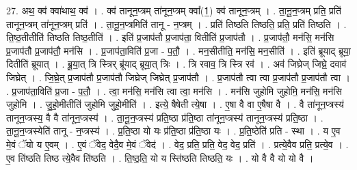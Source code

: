 \documentclass[17pt]{extarticle}
\begin{document}
27. अथ॒ क्व॑ क्वा॑थाथ॒ क्व॑ । . क्व॑ तानून॒प्त्रम् ता॑नून॒प्त्रम् क्वा᳚(1॒) क्व॑ तानून॒प्त्रम् । . ता॒नू॒न॒प्त्रम् प्रति॒ प्रति॑ तानून॒प्त्रम् ता॑नून॒प्त्रम् प्रति॑ । . ता॒नू॒न॒प्त्रमिति॑ तानू - न॒प्त्रम् । . प्रति॑ तिष्ठति तिष्ठति॒ प्रति॒ प्रति॑ तिष्ठति । . ति॒ष्ठ॒तीतीति॑ तिष्ठति तिष्ठ॒तीति॑ । . इति॑ प्र॒जाप॑तौ प्र॒जाप॑ता॒ वितीति॑ प्र॒जाप॑तौ । . प्र॒जाप॑तौ॒ मन॑सि॒ मन॑सि प्र॒जाप॑तौ प्र॒जाप॑तौ॒ मन॑सि । . प्र॒जाप॑ता॒विति॑ प्र॒जा - प॒तौ॒ । . मन॒सीतीति॒ मन॑सि॒ मन॒सीति॑ । . इति॑ ब्रूयाद् ब्रूया॒ दितीति॑ ब्रूयात् । . ब्रू॒या॒त् त्रि स्त्रिर् ब्रू॑याद् ब्रूया॒त् त्रिः । . त्रि रवाव॒ त्रि स्त्रि रव॑ । . अव॑ जिघ्रेज् जिघ्रे॒ दवाव॑ जिघ्रेत् । . जि॒घ्रे॒त् प्र॒जाप॑तौ प्र॒जाप॑तौ जिघ्रेज् जिघ्रेत् प्र॒जाप॑तौ । . प्र॒जाप॑तौ त्वा त्वा प्र॒जाप॑तौ प्र॒जाप॑तौ त्वा । . प्र॒जाप॑ता॒विति॑ प्र॒जा - प॒तौ॒ । . त्वा॒ मन॑सि॒ मन॑सि त्वा त्वा॒ मन॑सि । . मन॑सि जुहोमि जुहोमि॒ मन॑सि॒ मन॑सि जुहोमि । . जु॒हो॒मीतीति॑ जुहोमि जुहो॒मीति॑ । . इत्ये॒ षैषेती त्ये॒षा । . ए॒षा वै वा ए॒षैषा वै । . वै ता॑नून॒प्त्रस्य॑ तानून॒प्त्रस्य॒ वै वै ता॑नून॒प्त्रस्य॑ । . ता॒नू॒न॒प्त्रस्य॑ प्रति॒ष्ठा प्र॑ति॒ष्ठा ता॑नून॒प्त्रस्य॑ तानून॒प्त्रस्य॑ प्रति॒ष्ठा । . ता॒नू॒न॒प्त्रस्येति॑ तानू - न॒प्त्रस्य॑ । . प्र॒ति॒ष्ठा यो यः प्र॑ति॒ष्ठा प्र॑ति॒ष्ठा यः । . प्र॒ति॒ष्ठेति॑ प्रति - स्था । . य ए॒व मे॒वं ॅयो य ए॒वम् । . ए॒वं ॅवेद॒ वेदै॒व मे॒वं ॅवेद॑ । . वेद॒ प्रति॒ प्रति॒ वेद॒ वेद॒ प्रति॑ । . प्रत्ये॒वैव प्रति॒ प्रत्ये॒व । . ए॒व ति॑ष्ठति तिष्ठ त्ये॒वैव ति॑ष्ठति । . ति॒ष्ठ॒ति॒ यो य स्ति॑ष्ठति तिष्ठति॒ यः । . यो वै वै यो यो वै । \newline
\end{document}
